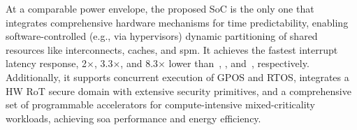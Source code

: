 At a comparable power envelope, the proposed SoC is the only one that integrates comprehensive hardware mechanisms for time predictability, enabling software-controlled (e.g., via hypervisors) dynamic partitioning of shared resources like interconnects, caches, and \gls{spm}. It achieves the fastest interrupt latency response, 2$\times$, 3.3$\times$, and 8.3$\times$ lower than~\cite{nxp_industrial_control}, \cite{grossierASILDAutomotivegradeMicrocontroller2023}, and~\cite{valenteHeterogeneousRISCVBased2024}, respectively. Additionally, it supports concurrent execution of GPOS and RTOS, integrates a HW RoT secure domain with extensive security primitives, and a comprehensive set of programmable accelerators for compute-intensive mixed-criticality workloads, achieving \gls{soa} performance and energy   efficiency.






